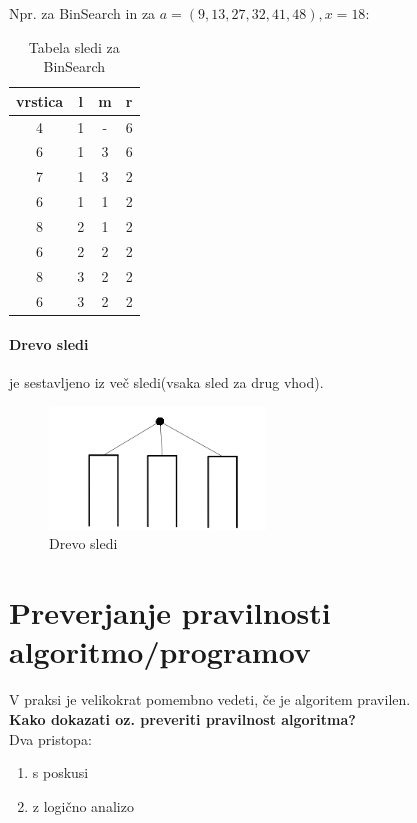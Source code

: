 \documentclass[a4paper,10pt]{article}
\begin{document}
Npr. za BinSearch in za $a=(9, 13, 27, 32, 41, 48), x=18$:

\begin{table}[h]
\centering
\begin{tabular}{c|ccc}
vrstica & l & m & r\\\hline
4 & 1 & - & 6\\
6 & 1 & 3 & 6\\
7 & 1 & 3 & 2\\
6 & 1 & 1 & 2\\
8 & 2 & 1 & 2\\
6 & 2 & 2 & 2\\
8 & 3 & 2 & 2\\\hline
6 & 3 & 2 & 2\\
\end{tabular}
\caption{Tabela sledi za BinSearch}
\end{table}

\paragraph{Drevo sledi} je sestavljeno iz ve\v c sledi(vsaka sled za drug vhod).

\begin{figure}[hbt]
	\centering
	\includegraphics[width=5.75cm,height=3.25cm]{Slike/DrevoSledi.png}
\caption{Drevo sledi}
\end{figure}

\section{Preverjanje pravilnosti  algoritmo/programov}
V praksi je velikokrat pomembno vedeti, \v ce je algoritem pravilen. \\
\textbf{Kako dokazati oz. preveriti pravilnost algoritma?} \\
Dva pristopa:
\begin{enumerate}
\item s poskusi
\item z logi\v cno analizo
\end{enumerate}
\end{document}
